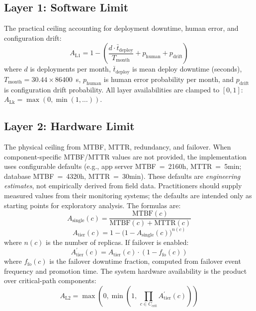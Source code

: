 \documentclass[10pt,twocolumn]{article}
\begin{document}
\subsection{Layer 1: Software Limit}
The practical ceiling accounting for deployment downtime, human error,
and configuration drift:
\begin{equation}
  A_{\text{L1}} = 1 - \left(
    \frac{d \cdot \bar{t}_{\text{deploy}}}{T_{\text{month}}}
    + p_{\text{human}} + p_{\text{drift}}
  \right)
\end{equation}
where $d$ is deployments per month, $\bar{t}_{\text{deploy}}$ is mean
deploy downtime (seconds), $T_{\text{month}} = 30.44 \times 86400$~s,
$p_{\text{human}}$ is human error probability per month, and
$p_{\text{drift}}$ is configuration drift probability.
All layer availabilities are clamped to $[0, 1]$:
$A_{\text{Lk}} = \max(0, \min(1, \ldots))$.

\subsection{Layer 2: Hardware Limit}
The physical ceiling from MTBF, MTTR, redundancy, and failover.
When component-specific MTBF/MTTR values are not provided, the
implementation uses configurable defaults (e.g., app server
MTBF~=~2160h, MTTR~=~5min; database MTBF~=~4320h, MTTR~=~30min).
These defaults are \emph{engineering estimates}, not empirically
derived from field data. Practitioners should supply measured
values from their monitoring systems; the defaults are intended
only as starting points for exploratory analysis.
The formulas are:
\begin{equation}
  A_{\text{single}}(c) = \frac{\text{MTBF}(c)}{\text{MTBF}(c) + \text{MTTR}(c)}
\end{equation}
\begin{equation}
  A_{\text{tier}}(c) = 1 - \bigl(1 - A_{\text{single}}(c)\bigr)^{n(c)}
\end{equation}
where $n(c)$ is the number of replicas.  If failover is enabled:
\begin{equation}
  A_{\text{tier}}^{\prime}(c) = A_{\text{tier}}(c) \cdot (1 - f_{\text{fo}}(c))
\end{equation}
where $f_{\text{fo}}(c)$ is the failover downtime fraction, computed from
failover event frequency and promotion time.  The system hardware
availability is the product over critical-path components:
\begin{equation}
  A_{\text{L2}} = \max\!\left(0, \min\!\left(1,\,
    \prod_{c \in C_{\text{crit}}} A_{\text{tier}}^{\prime}(c)\right)\right)
\end{equation}
\end{document}
